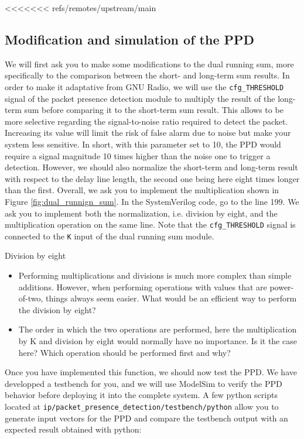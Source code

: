 \begin{enumerate}
<<<<<<< refs/remotes/upstream/main
\subsection{Modification and simulation of the PPD}


We will first ask you to make some modifications to the dual running sum, more specifically to the comparison between the short- and long-term sum results. In order to make it adaptative from GNU Radio, we will use the \texttt{cfg\_THRESHOLD} signal of the packet presence detection module to multiply the result of the long-term sum before comparing it to the short-term sum result. This allows to be more selective regarding the signal-to-noise ratio required to detect the packet. Increasing its value will limit the risk of false alarm due to noise but make your system less sensitive. In short, with this parameter set to 10, the PPD would require a signal magnitude 10 times higher than the noise one to trigger a detection. However, we should also normalize the short-term and long-term result with respect to the delay line length, the second one being here eight times longer than the first. Overall, we ask you to implement the multiplication shown in Figure \ref{fig:dual_runnign_sum}. In the SystemVerilog code, go to the line 199. We ask you to implement both the normalization, i.e. division by eight, and the multiplication operation on the same line. Note that the \texttt{cfg\_THRESHOLD} signal is connected to the \texttt{K} input of the dual running sum module.


\begin{bclogo}[couleur = gray!20, arrondi = 0.2, logo=\bcquestion]{Division by eight}
    \begin{itemize}
        \item Performing multiplications and divisions is much more complex than simple additions. However, when performing operations with values that are power-of-two, things always seem easier. What would be an efficient way to perform the division by eight?
        \item The order in which the two operations are performed, here the multiplication by K and division by eight would normally have no importance. Is it the case here? Which operation should be performed first and why?
    \end{itemize}
\end{bclogo}

Once you have implemented this function, we should now test the PPD. We have developped a testbench for you, and we will use ModelSim to verify the PPD behavior before deploying it into the complete system. A few python scripts located at \texttt{ip/packet\_presence\_detection/testbench/python} allow you to generate input vectors for the PPD and compare the testbench output with an expected result obtained with python:


\end{enumerate}
